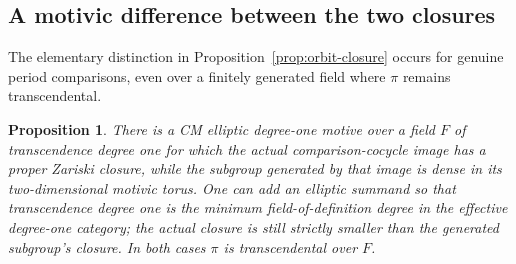 \documentclass[11pt]{article}
\newtheorem{proposition}[theorem]{Proposition}
\theoremstyle{definition}\newtheorem{definition}[theorem]{Definition}
\theoremstyle{remark}\newtheorem{remark}[theorem]{Remark}
\begin{document}
\subsection{A motivic difference between the two closures}
The elementary distinction in Proposition~\ref{prop:orbit-closure} occurs for genuine period comparisons, even over a finitely generated field where $\pi$ remains transcendental.

\begin{proposition}\label{prop:cm-orbit-counterexample}
There is a CM elliptic degree-one motive over a field $F$ of transcendence degree one for which the actual comparison-cocycle image has a proper Zariski closure, while the subgroup generated by that image is dense in its two-dimensional motivic torus. One can add an elliptic summand so that transcendence degree one is the minimum field-of-definition degree in the effective degree-one category; the actual closure is still strictly smaller than the generated subgroup's closure. In both cases $\pi$ is transcendental over $F$.
\end{proposition}
\end{document}
